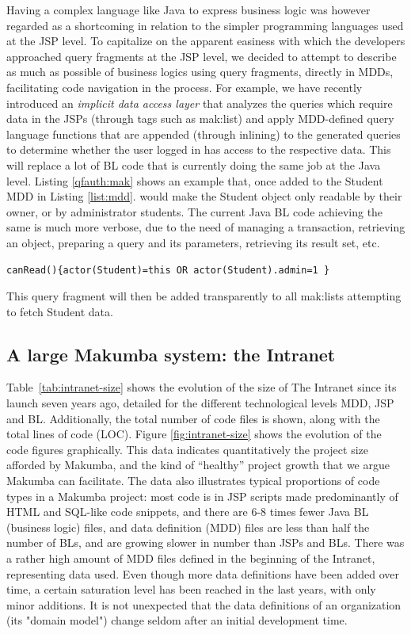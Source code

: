 \documentclass{llncs}
\begin{document}
Having a complex language like Java to express business logic was however regarded as a shortcoming in relation to the simpler programming languages used at the JSP level. To capitalize on the apparent easiness with which the developers approached query fragments at the JSP level, we decided to attempt to describe as much as possible of business logics using query fragments, directly in MDDs, facilitating code navigation in the process. For example, we have recently introduced an \textit{implicit data access layer} that analyzes the queries which require data in the JSPs (through tags such as mak:list) and apply MDD-defined query language functions that are appended (through inlining)  to the generated queries to determine whether the user logged in has access to the respective data. This will replace a lot of  BL code that is currently doing the same job at the Java level. Listing \ref{qfauth:mak} shows an example that, once added to the Student MDD in Listing \ref{list:mdd}. would make the Student object only readable by their owner, or by administrator students. The current Java BL code achieving the same is much more verbose, due to the need of managing a transaction, retrieving an object, preparing a query and its parameters, retrieving its result set, etc.
\lstset{basicstyle=\small, captionpos=b, caption= query fragment authorization rule, label=qfauth:mak, frame=shadowbox}
\begin{lstlisting}
canRead(){actor(Student)=this OR actor(Student).admin=1 }
\end{lstlisting}
This query fragment will then be added transparently to all mak:lists attempting to fetch Student data.

\subsection{A large Makumba system: the Intranet}
Table~\ref{tab:intranet-size} shows the evolution of the size of The Intranet since its launch seven years ago, detailed for the different technological levels MDD, JSP and BL. Additionally, the total number of code files is shown, along with the total lines of code (LOC).  Figure \ref{fig:intranet-size} shows the evolution of the code figures graphically. This data indicates quantitatively the project size afforded by Makumba, and the kind of ``healthy'' project growth that we argue Makumba can facilitate. The data also illustrates typical proportions of code types in a Makumba project: most code is in JSP scripts made predominantly of HTML and SQL-like code snippets, and there are 6-8 times fewer Java BL (business logic) files, and data definition (MDD) files are less than half the number of BLs, and are growing slower in number than JSPs and BLs. There was a rather high amount of MDD files defined in the beginning of the Intranet, representing data used. Even though more data definitions have been added over time, a certain saturation level has been reached in the last years, with only minor additions. It is not unexpected that the data definitions of an organization (its "domain model") change seldom after an initial development time. 
\end{document}
